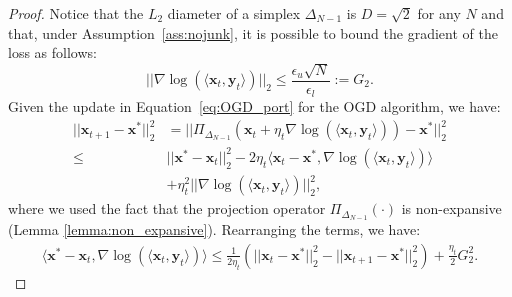 \begin{proof}
Notice that the $L_2$ diameter of a simplex $\Delta_{N-1}$ is $D = \sqrt{2}$ for any $N$ and that, under Assumption~\ref{ass:nojunk}, it is possible to bound the gradient of the loss as follows:
\begin{equation} \label{eq:bounded_gradient}
    ||\nabla \log (\langle \mathbf{x}_t, \mathbf{y}_t \rangle)||_2 \leq \frac{\epsilon_u \sqrt{N}}{\epsilon_l}:=G_2.
\end{equation}
Given the update in Equation~\eqref{eq:OGD_port} for the OGD algorithm, we have:
\begin{align}
     ||\mathbf{x}_{t+1} - \mathbf{x}^*||_2^2 &= ||\Pi_{\Delta_{N-1}}(\mathbf{x}_t + \eta_t \nabla \log(\langle \mathbf{x}_t, \mathbf{y}_t \rangle)) - \mathbf{x}^*||_2^2 \nonumber\\
    \leq & ||\mathbf{x}^* - \mathbf{x}_t||_2^2-2\eta_t\langle \mathbf{x}_t-\mathbf{x}^*,\nabla \log( \langle \mathbf{x}_t, \mathbf{y}_t \rangle) \rangle \nonumber \\ 
    & + \eta_t^2||\nabla \log( \langle \mathbf{x}_t, \mathbf{y}_t \rangle)||_2^2, \label{eq:magic}
\end{align}
where we used the fact that the projection operator $\Pi_{\Delta_{N-1}}(\cdot)$ is non-expansive (Lemma \ref{lemma:non_expansive}).
Rearranging the terms, we have:
\begin{align*}
    \langle \mathbf{x}^*-\mathbf{x}_t, \nabla \log (\langle \mathbf{x}_t, \mathbf{y}_t \rangle)\rangle\le \frac{1}{2\eta_t}\left( ||\mathbf{x}_t-\mathbf{x}^*||_2^2-||\mathbf{x}_{t+1}-\mathbf{x}^*||_2^2\right) + \frac{\eta_t}{2}G_2^2.
\end{align*}


\end{proof}

